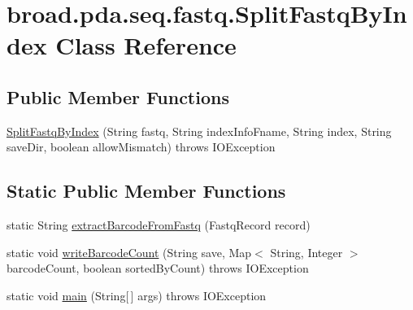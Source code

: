 \hypertarget{classbroad_1_1pda_1_1seq_1_1fastq_1_1_split_fastq_by_index}{\section{broad.\+pda.\+seq.\+fastq.\+Split\+Fastq\+By\+Index Class Reference}
\label{classbroad_1_1pda_1_1seq_1_1fastq_1_1_split_fastq_by_index}
}
\subsection*{Public Member Functions}
\begin{DoxyCompactItemize}
\item 
\hyperlink{classbroad_1_1pda_1_1seq_1_1fastq_1_1_split_fastq_by_index_a7c2f09a3e6b459723210c28843794c63}{Split\+Fastq\+By\+Index} (String fastq, String index\+Info\+Fname, String index, String save\+Dir, boolean allow\+Mismatch)  throws I\+O\+Exception 
\end{DoxyCompactItemize}
\subsection*{Static Public Member Functions}
\begin{DoxyCompactItemize}
\item 
static String \hyperlink{classbroad_1_1pda_1_1seq_1_1fastq_1_1_split_fastq_by_index_acef700a12fc3d162d647a0c6f70b1cc5}{extract\+Barcode\+From\+Fastq} (Fastq\+Record record)
\item 
static void \hyperlink{classbroad_1_1pda_1_1seq_1_1fastq_1_1_split_fastq_by_index_a3a49b6dfa8d290167bf0e35909195be2}{write\+Barcode\+Count} (String save, Map$<$ String, Integer $>$ barcode\+Count, boolean sorted\+By\+Count)  throws I\+O\+Exception 
\item 
static void \hyperlink{classbroad_1_1pda_1_1seq_1_1fastq_1_1_split_fastq_by_index_a366b68c09f3de3e48680f872495c1286}{main} (String\mbox{[}$\,$\mbox{]} args)  throws I\+O\+Exception
\end{DoxyCompactItemize}


